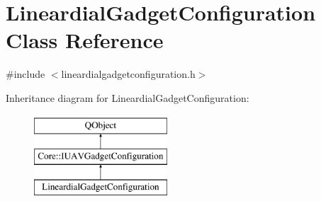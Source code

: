 \hypertarget{class_lineardial_gadget_configuration}{\section{Lineardial\-Gadget\-Configuration Class Reference}
\label{class_lineardial_gadget_configuration}
}


{\ttfamily \#include $<$lineardialgadgetconfiguration.\-h$>$}

Inheritance diagram for Lineardial\-Gadget\-Configuration\-:\begin{figure}[H]
\begin{center}
\leavevmode
\includegraphics[height=3.000000cm]{class_lineardial_gadget_configuration}
\end{center}
\end{figure}
